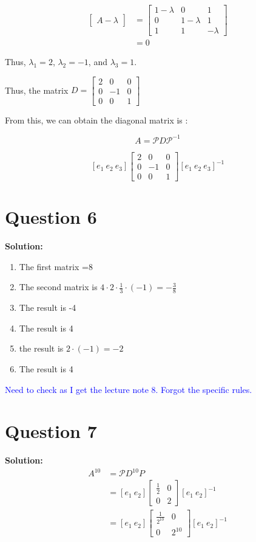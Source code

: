 \documentclass[11pt]{article} %
\begin{document}
\begin{align*}
	\begin{bmatrix}
		A-\lambda 
	\end{bmatrix}&=\begin{bmatrix}
		1-\lambda&0&1\\
		0&1-\lambda&1\\
		1&1&-\lambda
	\end{bmatrix}\\
	&=0
\end{align*}

Thus, $\lambda_1=2$, $\lambda_2=-1$, and $\lambda_3=1$.

Thus, the matrix $D=\begin{bmatrix}
	2&0&0\\
	0&-1&0\\
	0&0&1
\end{bmatrix}$

From this, we can obtain the diagonal matrix is :

$$A=\mathcal{P}D\mathcal{P}^{-1}$$

$$
[e_1\ e_2\ e_3]
\begin{bmatrix}
	2&0&0\\
	0&-1&0\\
	0&0&1
\end{bmatrix} [e_1\ e_2\ e_3]^{-1}$$

\section{Question 6}
\textbf{Solution:}
\begin{enumerate}
	\item The first matrix =8
	\item The second matrix is $4\cdot2\cdot\frac{1}{3}\cdot(-1)=-\frac{3}{8}$
	\item The result is -4
	\item The result is 4
	\item the result is $2\cdot (-1)=-2$
	\item The result is 4
\end{enumerate}
\textcolor{blue}{Need to check as I get the lecture note 8. Forgot the specific rules.}

\section{Question 7}
\textbf{Solution:}
\begin{align*}
	A^{10}&=\mathcal{P}D^{10}P\\
	&=[e_1\ e_2]\begin{bmatrix}
		\frac{1}{2}&0\\
		0&2
	\end{bmatrix}[e_1\ e_2]^{-1}\\
	&= [e_1\ e_2]\begin{bmatrix}
		\frac{1}{2^{10}}&0\\
		0&2^{10}
	\end{bmatrix}[e_1\ e_2]^{-1}
\end{align*}
\end{document}
